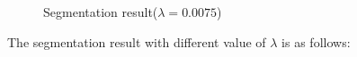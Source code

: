 \documentclass[paper=a4, fontsize=11pt]{scrartcl} %
\numberwithin{equation}{section} %
\numberwithin{figure}{section} %
\numberwithin{table}{section} %
\begin{document}
\begin{figure}[H]
\vspace{-5mm}
\caption{Segmentation result($\lambda = 0.0075$)\label{fig:batmanseg}}
\noindent{}
\end{figure}

\vspace{-5mm}
The segmentation result with different value of $\lambda$ is as follows:
\end{document}
